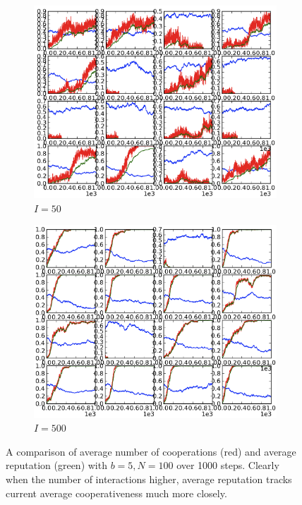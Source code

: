\documentclass{amsart}
\begin{document}
\begin{figure}[h!tbp]
  \begin{subfigure}{.485\linewidth}
    \includegraphics[width=\textwidth]{lag50.png}
    \caption{$I=50$}
    \label{fig:lag50}
  \end{subfigure}
  \hspace{.01\linewidth}
  \begin{subfigure}{.485\linewidth}
    \includegraphics[width=\textwidth]{lag500.png}
    \caption{$I=500$}
    \label{fig:lag500}
  \end{subfigure}
\caption{A comparison of average number of cooperations (red) and
  average reputation (green) with $b=5,N=100$ over 1000 steps. Clearly
  when the number of interactions higher, average reputation tracks
  current average cooperativeness much more closely.}
\end{figure}
\end{document}
